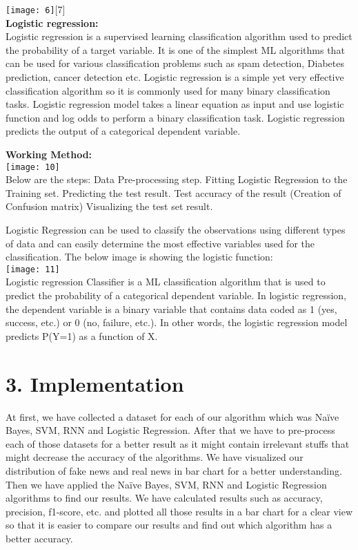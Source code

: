 \documentclass[12pt]{article}
\begin{document}
\texttt{[image: 6]}[7]\\
\textbf{Logistic regression:}\\
Logistic regression is a supervised learning classification algorithm used to predict the probability of a target variable. It is one of the simplest ML algorithms that can be used for various classification problems such as spam detection, Diabetes prediction, cancer detection etc.
Logistic regression is a simple yet very effective classification algorithm so it is commonly used for many binary classification tasks. Logistic regression model takes a linear equation as input and use logistic function and log odds to perform a binary classification task.
Logistic regression predicts the output of a categorical dependent variable.


\textbf{Working Method:}\\
\texttt{[image: 10]}\\
\newpage
Below are the steps:
Data Pre-processing step.
Fitting Logistic Regression to the Training set.
Predicting the test result.
Test accuracy of the result (Creation of Confusion matrix)
Visualizing the test set result.


Logistic Regression can be used to classify the observations using different types of data and can easily determine the most effective variables used for the classification. The below image is showing the logistic function:\\
\texttt{[image: 11]}\\
Logistic regression Classifier is a ML classification algorithm that is used to predict the probability of a categorical dependent variable. In logistic regression, the dependent variable is a binary variable that contains data coded as 1 (yes, success, etc.) or 0 (no, failure, etc.). In other words, the logistic regression model predicts P(Y=1) as a function of X.

\section*{3. Implementation}
At first, we have collected a dataset for each of our algorithm which was Naïve Bayes, SVM, RNN and Logistic Regression. After that we have to pre-process each of those datasets for a better result as it might contain irrelevant stuffs that might decrease the accuracy of the algorithms. We have visualized our distribution of fake news and real news in bar chart for a better understanding. Then we have applied the Naïve Bayes, SVM, RNN and Logistic Regression algorithms to find our results. We have calculated results such as accuracy, precision, f1-score, etc. and plotted all those results in a bar chart for a clear view so that it is easier to compare our results and find out which algorithm has a better accuracy. 
\end{document}
